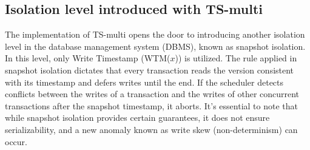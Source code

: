 \subsection*{Isolation level introduced with TS-multi}
The implementation of TS-multi opens the door to introducing another isolation level in the database management system (DBMS), known as snapshot isolation.
In this level, only Write Timestamp (WTM($x$)) is utilized.
The rule applied in snapshot isolation dictates that every transaction reads the version consistent with its timestamp and defers writes until the end. 
If the scheduler detects conflicts between the writes of a transaction and the writes of other concurrent transactions after the snapshot timestamp, it aborts.
It's essential to note that while snapshot isolation provides certain guarantees, it does not ensure serializability, and a new anomaly known as write skew (non-determinism) can occur.